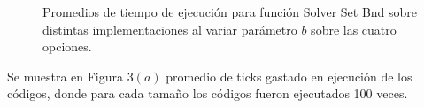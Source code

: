  \begin{figure}[htbp]
\centering


\caption{Promedios de tiempo de ejecución para función Solver Set Bnd sobre distintas implementaciones al variar parámetro $b$ sobre las cuatro opciones.} \label{fig:lego}
\end{figure}



Se muestra en Figura 3$(a)$ promedio de ticks gastado en ejecución de los códigos, donde para cada tamaño los códigos fueron ejecutados 100 veces.
 

